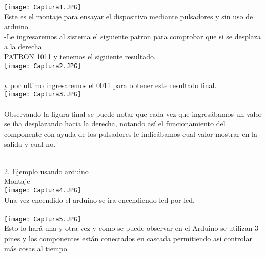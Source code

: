 \documentclass{article}
\begin{document}
\texttt{[image: Captura1.JPG]}\\
Este es el montaje para ensayar el dispositivo mediante pulsadores y sin uso de arduino.\\

-Le ingresaremos al sistema el siguiente patron para comprobar que si se desplaza a la derecha.\\
PATRON 1011 y tenemos el siguiente resultado.\\
\texttt{[image: Captura2.JPG]}\\
\\
y por ultimo ingresaremos el 0011 para obtener este resultado final.\\
\texttt{[image: Captura3.JPG]}\\
\\
Observando la figura final se puede notar que cada vez que ingresábamos un valor se iba desplazando hacia la derecha, notando así el funcionamiento del componente con ayuda de los pulsadores le indicábamos cual valor mostrar en la salida y cual no.\\
\\
\item 2. Ejemplo usando arduino\\
Montaje\\
\texttt{[image: Captura4.JPG]}\\
Una vez encendido el arduino se ira encendiendo led por led.\\
\\
\texttt{[image: Captura5.JPG]}\\
Esto lo hará una y otra vez y como se puede observar en el Arduino se utilizan 3 pines y los componentes están conectados en cascada permitiendo así controlar más cosas al tiempo.\\



\newpage
\end{document}
